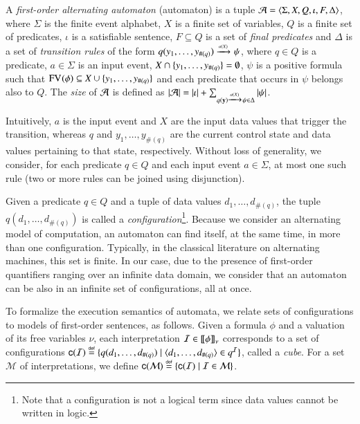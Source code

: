 \documentclass{llncs}
\begin{document}
A \emph{first-order alternating automaton} (automaton) is a tuple $\mathcal{A}
= \langle \Sigma,X,Q,\iota,F,\Delta \rangle$, where $\Sigma$ is the finite
event alphabet, $X$ is a finite set of variables, $Q$ is a finite set
of predicates, $\iota$ is a satisfiable sentence, $F \subseteq Q$ is a
set of \emph{final predicates} and $\Delta$ is a set of
\emph{transition rules} of the form \(q(y_1,\ldots,y_{\#(q)})
\xrightarrow{{\scriptscriptstyle a(X)}}_{{\scriptstyle }} \psi\), where $q \in Q$ is a predicate, $a \in \Sigma$
is an input event, $X \cap \{ y_1,\ldots,y_{\#(q)} \} = \emptyset$,
$\psi$ is a positive formula such that $\mathrm{FV}_{}(\phi) \subseteq X \cup
\{ y_1,\ldots,y_{\#(q)} \}$ and each predicate that occurs in $\psi$
belongs also to $Q$. The \emph{size} of $\mathcal{A}$ is defined as ${|{\mathcal{A}}|} =
{|{\iota}|} + \sum_{q(\mathbf y) \xrightarrow{{\scriptscriptstyle a(X)}}_{{\scriptstyle }} \psi \in \Delta}
{|{\psi}|}$.

Intuitively, $a$ is the input event and $X$ are the input data values
that trigger the transition, whereas $q$ and $y_1,\ldots,y_{\#(q)}$
are the current control state and data values pertaining to that
state, respectively. Without loss of generality, we consider, for each
predicate $q \in Q$ and each input event $a \in \Sigma$, at most one
such rule (two or more rules can be joined using disjunction). 

Given a predicate $q \in Q$ and a tuple of data values
$d_1,\ldots,d_{\#(q)}$, the tuple $q(d_1,\ldots,d_{\#(q)})$ is called
a \emph{configuration}\footnote{Note that a configuration is not a
  logical term since data values cannot be written in logic.}.
Because we consider an alternating model of computation, an automaton
can find itself, at the same time, in more than one
configuration. Typically, in the classical literature on alternating
machines, this set is finite. In our case, due to the presence of
first-order quantifiers ranging over an infinite data domain, we
consider that an automaton can be also in an infinite set of
configurations, all at once.

To formalize the execution semantics of automata, we relate sets of
configurations to models of first-order sentences, as follows. Given a
formula $\phi$ and a valuation of its free variables $\nu$, each
interpretation $\mathcal{I} \in {\bf [\![} \phi {\bf ]\!]}_\nu$ corresponds to a set of
configurations $\mathsf{c}({\mathcal{I}}) \stackrel{\scriptscriptstyle{\mathsf{def}}}{=} \{ q(d_1,\ldots,d_{\#(q)}) \mid
  \langle d_1,\ldots,d_{\#(q)} \rangle \in q^{\mathcal{I}} \}$, called a \emph{cube}. For a
set $\mathcal{M}$ of interpretations, we define $\mathsf{c}({\mathcal{M}})
\stackrel{\scriptscriptstyle{\mathsf{def}}}{=} \{ \mathsf{c}({\mathcal{I}}) \mid \mathcal{I} \in \mathcal{M} \}$.
\end{document}
